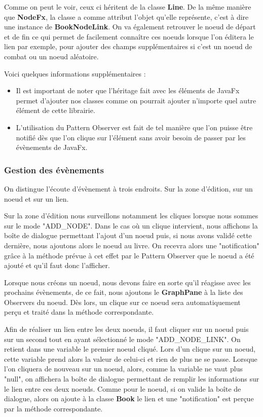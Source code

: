 				Comme on peut le voir, ceux ci héritent de la classe \textbf{Line}. De la même manière que \textbf{NodeFx}, la classe a comme attribut l'objet qu'elle représente, c'est à dire une instance de \textbf{BookNodeLink}. On va également retrouver le noeud de départ et de fin ce qui permet de facilement connaître ces noeuds lorsque l'on éditera le lien par exemple, pour ajouter des champs supplémentaires si c'est un noeud de combat ou un noeud aléatoire.

				Voici quelques informations supplémentaires :

				\begin{itemize}
					\item{Il est important de noter que l'héritage fait avec les éléments de JavaFx permet d'ajouter nos classes comme on pourrait ajouter n'importe quel autre élément de cette librairie.}
					\item{L'utilisation du Pattern Observer est fait de tel manière que l'on puisse être notifié dès que l'on clique sur l'élément sans avoir besoin de passer par les évènements de JavaFx.}
				\end{itemize}

			\subsubsection{Gestion des évènements}

				On distingue l'écoute d'évènement à trois endroits. Sur la zone d'édition, sur un noeud et sur un lien.

				Sur la zone d'édition nous surveillons notamment les cliques lorsque nous sommes sur le mode "ADD\_NODE". Dans le cas où un clique intervient, nous affichons la boîte de dialogue permettant l'ajout d'un noeud puis, si nous avons validé cette dernière, nous ajoutons alors le noeud au livre. On recevra alors une "notification" grâce à la méthode prévue à cet effet par le Pattern Observer que le noeud a été ajouté et qu'il faut donc l'afficher.

				Lorsque nous créons un noeud, nous devons faire en sorte qu'il réagisse avec les prochains évènements, de ce fait, nous ajoutons le \textbf{GraphPane} à la liste des Observers du noeud. Dès lors, un clique sur ce noeud sera automatiquement perçu et traité dans la méthode correspondante.

				Afin de réaliser un lien entre les deux noeuds, il faut cliquer sur un noeud puis sur un second tout en ayant sélectionné le mode "ADD\_NODE\_LINK". On retient dans une variable le premier noeud cliqué. Lors d'un clique sur un noeud, cette variable prend alors la valeur de celui-ci et rien de plus ne se passe. Lorsque l'on cliquera de nouveau sur un noeud, alors, comme la variable ne vaut plus "null", on affichera la boîte de dialogue permettant de remplir les informations sur le lien entre ces deux noeuds. Comme pour le noeud, si on valide la boîte de dialogue, alors on ajoute à la classe \textbf{Book} le lien et une "notification" est perçue par la méthode correspondante.

